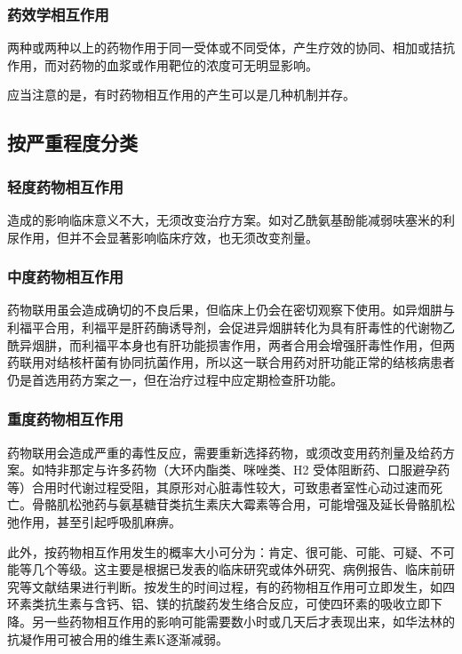 \subsubsection{药效学相互作用}

两种或两种以上的药物作用于同一受体或不同受体，产生疗效的协同、相加或拮抗作用，而对药物的血浆或作用靶位的浓度可无明显影响。

应当注意的是，有时药物相互作用的产生可以是几种机制并存。

\subsection{按严重程度分类}

\subsubsection{轻度药物相互作用}

造成的影响临床意义不大，无须改变治疗方案。如对乙酰氨基酚能减弱呋塞米的利尿作用，但并不会显著影响临床疗效，也无须改变剂量。

\subsubsection{中度药物相互作用}

药物联用虽会造成确切的不良后果，但临床上仍会在密切观察下使用。如异烟肼与利福平合用，利福平是肝药酶诱导剂，会促进异烟肼转化为具有肝毒性的代谢物乙酰异烟肼，而利福平本身也有肝功能损害作用，两者合用会增强肝毒性作用，但两药联用对结核杆菌有协同抗菌作用，所以这一联合用药对肝功能正常的结核病患者仍是首选用药方案之一，但在治疗过程中应定期检查肝功能。

\subsubsection{重度药物相互作用}

药物联用会造成严重的毒性反应，需要重新选择药物，或须改变用药剂量及给药方案。如特非那定与许多药物（大环内酯类、咪唑类、H{2}
受体阻断药、口服避孕药等）合用时代谢过程受阻，其原形对心脏毒性较大，可致患者室性心动过速而死亡。骨骼肌松弛药与氨基糖苷类抗生素庆大霉素等合用，可能增强及延长骨骼肌松弛作用，甚至引起呼吸肌麻痹。

此外，按药物相互作用发生的概率大小可分为：肯定、很可能、可能、可疑、不可能等几个等级。这主要是根据已发表的临床研究或体外研究、病例报告、临床前研究等文献结果进行判断。按发生的时间过程，有的药物相互作用可立即发生，如四环素类抗生素与含钙、铝、镁的抗酸药发生络合反应，可使四环素的吸收立即下降。另一些药物相互作用的影响可能需要数小时或几天后才表现出来，如华法林的抗凝作用可被合用的维生素K逐渐减弱。

